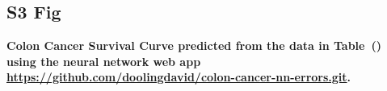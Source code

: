 \documentclass[10pt,letterpaper]{article}
\begin{document}
\subsection*{S3 Fig}
\label{S3_Fig}
{\bf Colon Cancer Survival Curve predicted from the data in 
Table~() using the neural network web app \url{https://github.com/doolingdavid/colon-cancer-nn-errors.git}.}




\end{document}
